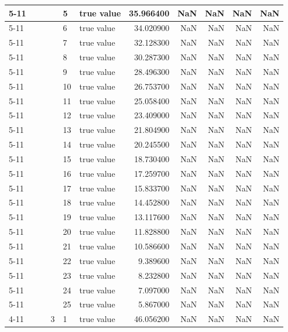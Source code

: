 \begin{tabular}{llllllrrrrr}
\cline{5-11}
 &  &  &  & 5 & true value & 35.966400 & NaN & NaN & NaN & NaN \\
\cline{5-11}
 &  &  &  & 6 & true value & 34.020900 & NaN & NaN & NaN & NaN \\
\cline{5-11}
 &  &  &  & 7 & true value & 32.128300 & NaN & NaN & NaN & NaN \\
\cline{5-11}
 &  &  &  & 8 & true value & 30.287300 & NaN & NaN & NaN & NaN \\
\cline{5-11}
 &  &  &  & 9 & true value & 28.496300 & NaN & NaN & NaN & NaN \\
\cline{5-11}
 &  &  &  & 10 & true value & 26.753700 & NaN & NaN & NaN & NaN \\
\cline{5-11}
 &  &  &  & 11 & true value & 25.058400 & NaN & NaN & NaN & NaN \\
\cline{5-11}
 &  &  &  & 12 & true value & 23.409000 & NaN & NaN & NaN & NaN \\
\cline{5-11}
 &  &  &  & 13 & true value & 21.804900 & NaN & NaN & NaN & NaN \\
\cline{5-11}
 &  &  &  & 14 & true value & 20.245500 & NaN & NaN & NaN & NaN \\
\cline{5-11}
 &  &  &  & 15 & true value & 18.730400 & NaN & NaN & NaN & NaN \\
\cline{5-11}
 &  &  &  & 16 & true value & 17.259700 & NaN & NaN & NaN & NaN \\
\cline{5-11}
 &  &  &  & 17 & true value & 15.833700 & NaN & NaN & NaN & NaN \\
\cline{5-11}
 &  &  &  & 18 & true value & 14.452800 & NaN & NaN & NaN & NaN \\
\cline{5-11}
 &  &  &  & 19 & true value & 13.117600 & NaN & NaN & NaN & NaN \\
\cline{5-11}
 &  &  &  & 20 & true value & 11.828800 & NaN & NaN & NaN & NaN \\
\cline{5-11}
 &  &  &  & 21 & true value & 10.586600 & NaN & NaN & NaN & NaN \\
\cline{5-11}
 &  &  &  & 22 & true value & 9.389600 & NaN & NaN & NaN & NaN \\
\cline{5-11}
 &  &  &  & 23 & true value & 8.232800 & NaN & NaN & NaN & NaN \\
\cline{5-11}
 &  &  &  & 24 & true value & 7.097000 & NaN & NaN & NaN & NaN \\
\cline{5-11}
 &  &  &  & 25 & true value & 5.867000 & NaN & NaN & NaN & NaN \\
\cline{4-11} \cline{5-11}
 &  &  & \multirow[t]{25}{*}{3} & 1 & true value & 46.056200 & NaN & NaN & NaN & NaN \\

\end{tabular}

